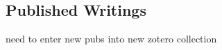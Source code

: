 
\subsection{Published Writings}
\nocite{*}
\printbibliography[keyword={published-writings},title={Published Writings},heading=none]
\todo need to enter new pubs into new zotero collection